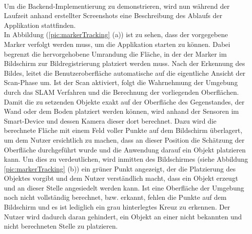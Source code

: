 \\ 
Um die Backend-Implementierung zu demonstrieren, wird nun während der Laufzeit anhand erstellter Screenshots eine Beschreibung des Ablaufs der Applikation stattfinden.
\\ 
In Abbildung (\ref{pic:markerTracking} (a)) ist zu sehen, dass der vorgegebene Marker verfolgt werden muss, um die Applikation starten zu können. Dabei begrenzt 
die hervorgehobene Umrandung die Fläche, in der der Marker im Bildschirm zur Bildregistrierung platziert werden muss. Nach der Erkennung des Bildes, 
leitet die Benutzeroberfläche automatische auf die eigentliche Ansicht der Scan-Phase um. Ist der Scan aktiviert, folgt die Wahrnehmung der Umgebung durch das 
\acs{SLAM} Verfahren und die Berechnung der vorliegenden Oberflächen. Damit die zu setzenden Objekte exakt auf der Oberfläche des Gegenstandes, der Wand oder dem 
Boden platziert werden können, wird anhand der Sensoren im Smart-Device und dessen Kamera dieser dort berechnet. Dazu wird die berechnete Fläche mit einem Feld voller 
Punkte auf dem Bildschirm überlagert, um dem Nutzer ersichtlich zu machen, 
dass an dieser Position die Schätzung der Oberfläche durchgeführt wurde und die Anwendung darauf ein Objekt platzieren kann. Um dies zu verdeutlichen, wird inmitten 
des Bildschirmes (siehe Abbildung \ref{pic:markerTracking} (b)) ein grüner Punkt angezeigt, der die Platzierung des Objektes vorgibt und dem Nutzer verständlich macht, 
dass ein Objekt erzeugt und an dieser Stelle angesiedelt werden kann. Ist eine Oberfläche der Umgebung noch nicht vollständig berechnet, bzw. erkannt, fehlen 
die Punkte auf dem Bildschirm und es ist lediglich ein grau hinterlegtes Kreuz zu erkennen. Der Nutzer wird dadurch daran gehindert, ein Objekt an einer nicht bekannten 
und nicht berechneten Stelle zu platzieren. 
